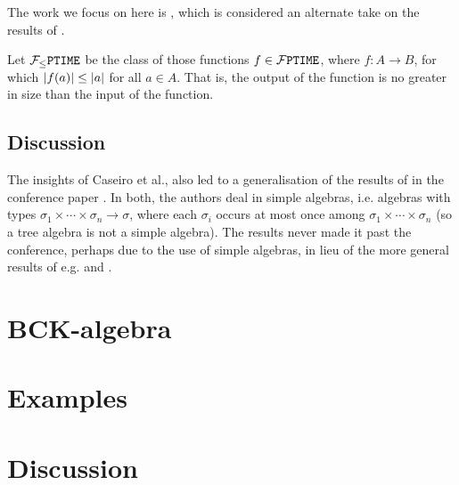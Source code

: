 The work we focus on here is \cite{aehlig-schwichtenberg-2002}, which is
considered an alternate take on the results of \cite{hofmann-2003}.

\begin{definition} Let $\mathcal{F}_{\leq}\mathtt{PTIME}{}$ be the class of those functions $f \in
\mathcal{F}\mathtt{PTIME}{}$, where $f : A \rightarrow B$, for which ${\mathopen{}\left|{f{\mathopen{}\left({a}\right)\mathclose{}}}\right|\mathclose{}} \leq
{\ensuremath{\mathopen{}\left|{a}\right|\mathclose{}}}$ for all $a \in A$. That is, the output of the function is no greater
in size than the input of the function. \end{definition}

\subsection{Discussion}

The insights of Caseiro et al., also led to a generalisation of the results of
\cite{marion-2003} in the conference paper \cite{marion-moyen-2000}. In both,
the authors deal in simple algebras, i.e.  algebras with types $\sigma_1 \times
\cdots \times \sigma_n \rightarrow \sigma$, where each $\sigma_i$ occurs at
most once among $\sigma_1 \times \cdots \times \sigma_n$ (so a tree algebra is
not a simple algebra).  The results never made it past the conference,
perhaps due to the use of simple algebras, in lieu of the more general results
of e.g.  \cite{aehlig-schwichtenberg-2002} and \cite{hofmann-2003}.

\section{BCK-algebra}


\section{Examples}

\section{Discussion}
